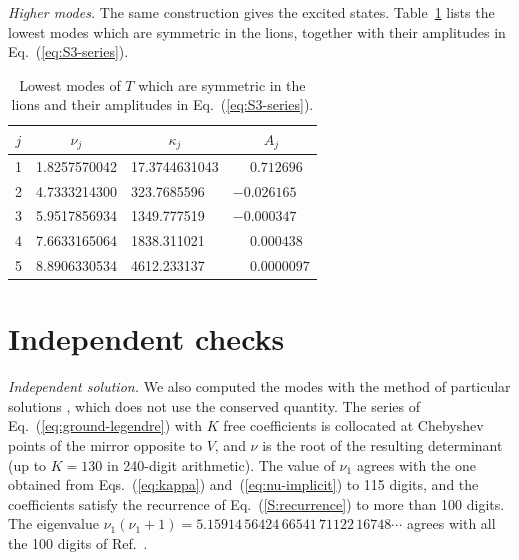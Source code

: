 \emph{Higher modes.} The same construction gives the excited states. Table~\ref{S:tab-modes} lists the lowest modes which are symmetric in the lions, together with their amplitudes in Eq.~(\ref{eq:S3-series}).

\begin{table}[h]
\caption{Lowest modes of $T$ which are symmetric in the lions and their amplitudes in Eq.~(\ref{eq:S3-series}).}
\label{S:tab-modes}
\begin{ruledtabular}
\begin{tabular}{clll}
$j$ & \multicolumn{1}{c}{$\nu_j$} & \multicolumn{1}{c}{$\kappa_j$} & \multicolumn{1}{c}{$A_j$}\\
\hline
1 & 1.8257570042 & 17.3744631043 & $\phantom{-}0.712696$\\
2 & 4.7333214300 & 323.7685596 & $-0.026165$\\
3 & 5.9517856934 & 1349.777519 & $-0.000347$\\
4 & 7.6633165064 & 1838.311021 & $\phantom{-}0.000438$\\
5 & 8.8906330534 & 4612.233137 & $\phantom{-}0.0000097$\\
\end{tabular}
\end{ruledtabular}
\end{table}

\section{Independent checks} \label{S:sec-checks}

\emph{Independent solution.} We also computed the modes with the method of particular solutions \cite{FHM67,BT05}, which does not use the conserved quantity. The series of Eq.~(\ref{eq:ground-legendre}) with $K$ free coefficients is collocated at Chebyshev points of the mirror opposite to $V$, and $\nu$ is the root of the resulting determinant (up to $K = 130$ in 240-digit arithmetic). The value of $\nu_1$ agrees with the one obtained from Eqs.~(\ref{eq:kappa}) and~(\ref{eq:nu-implicit}) to 115 digits, and the coefficients satisfy the recurrence of Eq.~(\ref{S:recurrence}) to more than 100 digits. The eigenvalue $\nu_1 (\nu_1 + 1) = 5.15914\,56424\,66541\,71122\,16748 \cdots$ agrees with all the 100 digits of Ref.~\cite{DS20}.

